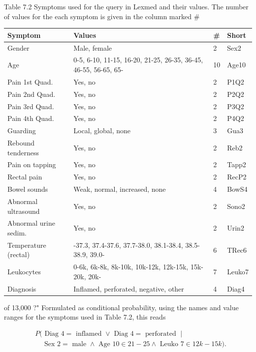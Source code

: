 \documentclass[10pt]{book}
\begin{document}
Table 7.2 Symptoms used for the query in Lexmed and their values. The number of values for the each symptom is given in the column marked \#


\begin{center}
\begin{tabular}{|l|l|l|l|}
\hline
Symptom & Values & \# & Short \\
\hline
Gender & Male, female & 2 & Sex2 \\
\hline
Age & 0-5, 6-10, 11-15, 16-20, 21-25, 26-35, 36-45, 46-55, 56-65, 65- & 10 & Age10 \\\index{Q-learning}
\hline
Pain 1st Quad. & Yes, no & 2 & P1Q2 \\
\hline
Pain 2nd Quad. & Yes, no & 2 & P2Q2 \\
\hline
Pain 3rd Quad. & Yes, no & 2 & P3Q2 \\
\hline
Pain 4th Quad. & Yes, no & 2 & P4Q2 \\
\hline
Guarding & Local, global, none & 3 & Gua3 \\
\hline
Rebound tenderness & Yes, no & 2 & Reb2 \\
\hline
Pain on tapping & Yes, no & 2 & Tapp2 \\
\hline
Rectal pain & Yes, no & 2 & RecP2 \\
\hline
Bowel sounds & Weak, normal, increased, none & 4 & BowS4 \\
\hline
Abnormal ultrasound & Yes, no & 2 & Sono2 \\
\hline
Abnormal urine sedim. & Yes, no & 2 & Urin2 \\
\hline
Temperature (rectal) & -37.3, 37.4-37.6, 37.7-38.0, 38.1-38.4, 38.5-38.9, 39.0- & 6 & TRec6 \\
\hline
Leukocytes & 0-6k, 6k-8k, 8k-10k, 10k-12k, 12k-15k, 15k-20k, 20k- & 7 & Leuko7 \\
\hline
Diagnosis & Inflamed, perforated, negative, other & 4 & Diag4 \\
\hline
\end{tabular}
\end{center}

of 13,000 ?" Formulated as conditional probability, using the names and value ranges for the symptoms used in Table 7.2, this reads

$$
\begin{aligned}
& P(\text { Diag } 4=\text { inflamed } \vee \text { Diag } 4=\text { perforated } \mid \\
& \quad \text { Sex } 2=\text { male } \wedge \text { Age } 10 \in 21-25 \wedge \text { Leuko } 7 \in 12 k-15 k) .
\end{aligned}
$$
\end{document}
